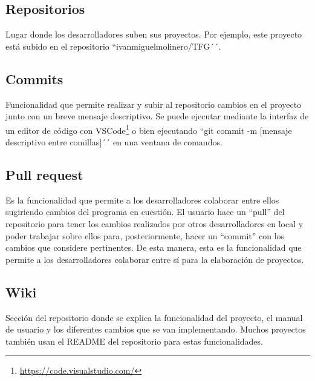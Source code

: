 \documentclass[a4paper, 12pt]{book}
\begin{document}
\subsection{Repositorios}
Lugar donde los desarrolladores suben sus proyectos. Por ejemplo, este proyecto está subido en el repositorio ``ivanmiguelmolinero/TFG´´.

\subsection{Commits}
Funcionalidad que permite realizar y subir al repositorio cambios en el proyecto junto con un breve mensaje descriptivo. Se puede ejecutar mediante la interfaz de un editor de código con VSCode\footnote{\url{https://code.visualstudio.com/}} o bien ejecutando ``git commit -m [mensaje descriptivo entre comillas]´´ en una ventana de comandos.

\subsection{Pull request}
Es la funcionalidad que permite a los desarrolladores colaborar entre ellos sugiriendo cambios del programa en cuestión. El usuario hace un ``pull'' del repositorio para tener los cambios realizados por otros desarrolladores en local y poder trabajar sobre ellos para, posteriormente, hacer un ``commit'' con los cambios que considere pertinentes. De esta manera, esta es la funcionalidad que permite a los desarrolladores colaborar entre sí para la elaboración de proyectos.

\subsection{Wiki}
Sección del repositorio donde se explica la funcionalidad del proyecto, el manual de usuario y los diferentes cambios que se van implementando. Muchos proyectos también usan el README del repositorio para estas funcionalidades.
\end{document}
